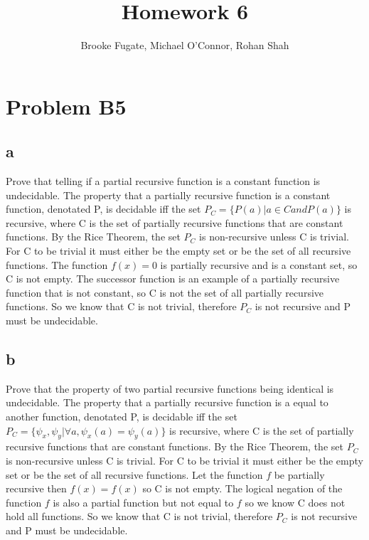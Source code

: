 \documentclass[12pt]{article}
\begin{document}
\pagestyle{plain}
\titleformat{\subsection}[runin]
  {\normalfont\large\bfseries}{\thesubsection}{1em}{}
\titleformat{\subsubsection}[runin]
  {\bfseries}{}{1em}{}

\title{Homework 6}
\author{Brooke Fugate, Michael O'Connor, Rohan Shah}
\date{}

\maketitle

\section*{Problem B5}
\subsection*{a}
Prove that telling if a partial recursive function is a constant function is undecidable.  The property that a partially recursive function is a constant function, denotated P, is decidable iff the set $P_C = \{P(a)|a \in C and P(a)\}$ is recursive, where C is the set of partially recursive functions that are constant functions. By the Rice Theorem, the set $P_C$ is non-recursive unless C is trivial.  For C to be trivial it must either be the empty set or be the set of all recursive functions. The function $f(x)=0$ is partially recursive and is a constant set, so C is not empty.  The successor function is an example of a partially recursive function that is not constant, so C is not the set of all partially recursive functions.  So we know that C is not trivial, therefore $P_C$ is not recursive and P must be undecidable. 
\subsection*{b} 
Prove that the property of two partial recursive functions being identical is undecidable.   The property that a partially recursive function is a equal to another function, denotated P, is decidable iff the set $P_C = \{\psi_x, \psi_y|\forall a, \psi_x(a) = \psi_y(a)\}$ is recursive, where C is the set of partially recursive functions that are constant functions. By the Rice Theorem, the set $P_C$ is non-recursive unless C is trivial.  For C to be trivial it must either be the empty set or be the set of all recursive functions. Let the function $f$ be partially recursive then $f(x) = f(x)$ so C is not empty.  The logical negation of the function $f$ is also a partial function but not equal to $f$ so we know C does not hold all functions.  So we know that C is not trivial, therefore $P_C$ is not recursive and P must be undecidable. 
\end{document}
